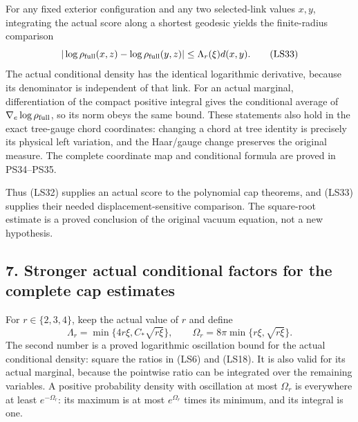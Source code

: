 \documentclass[11pt]{article}
\begin{document}
For any fixed exterior configuration and any two selected-link
values \(x,y\), integrating the actual score along a shortest
geodesic yields the finite-radius comparison
\[
 |\log\rho_{\rm full}(x,z)-\log\rho_{\rm full}(y,z)|
                              \le\Lambda_r(\xi)d(x,y).
 \tag{LS33}
\]
The actual conditional density has the identical logarithmic
derivative, because its denominator is independent of that link.
For an actual marginal, differentiation of the compact positive
integral gives the conditional average of
\(\nabla_e\log\rho_{\rm full}\), so its norm obeys the same
bound. These statements also hold in the exact tree-gauge chord
coordinates: changing a chord at tree identity is precisely its
physical left variation, and the Haar/gauge change preserves the
original measure. The complete coordinate map and conditional
formula are proved in PS34–PS35.

Thus (LS32) supplies an actual score to the polynomial cap
theorems, and (LS33) supplies their needed displacement-sensitive
comparison. The square-root estimate is a proved conclusion of
the original vacuum equation, not a new hypothesis.

\subsection*{7. Stronger actual conditional factors for the complete cap estimates}

For \(r\in\{2,3,4\}\), keep the actual value of \(r\) and define
\[
 \Lambda_r=\min\{4r\xi,C_*\sqrt{r\xi}\},\qquad
 \Omega_r=8\pi\min\{r\xi,\sqrt{r\xi}\}.
 \tag{LS34}
\]
The second number is a proved logarithmic oscillation bound for
the actual conditional density: square the ratios in (LS6) and
(LS18). It is also valid for its actual marginal, because the
pointwise ratio can be integrated over the remaining variables.
A positive probability density with oscillation at most
\(\Omega_r\) is everywhere at least \(e^{-\Omega_r}\):
its maximum is at most \(e^{\Omega_r}\) times its minimum,
and its integral is one.
\end{document}
